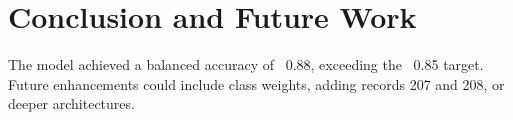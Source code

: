 \documentclass[a4paper,12pt]{article}
\begin{document}
\section{Conclusion and Future Work}
The model achieved a balanced accuracy of ~0.88, exceeding the ~0.85 target. Future enhancements could include class weights, adding records 207 and 208, or deeper architectures.
\end{document}
